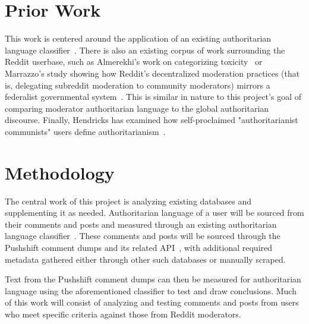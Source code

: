 \documentclass[letterpaper,twocolumn,10pt]{article}
\begin{document}
\section{Prior Work}

This work is centered around the application of an existing authoritarian language classifier~\cite{classifier}. There is also an existing corpus of work surrounding the Reddit userbase, such as Almerekhi's work on categorizing toxicity~\cite{reddit-toxicity} or Marrazzo's study showing how Reddit's decentralized moderation practices (that is, delegating subreddit moderation to community moderators) mirrors a federalist governmental system~\cite{federalist}. This is similar in nature to this project's goal of comparing moderator authoritarian language to the global authoritarian discourse. Finally, Hendricks has examined how self-proclaimed "authoritarianist communists" users define authoritarianism~\cite{communists}.

\section{Methodology}


The central work of this project is analyzing existing databases and supplementing it as needed. Authoritarian language of a user will be sourced from their comments and posts and measured through an existing authoritarian language classifier~\cite{classifier}. These comments and posts will be sourced through the Pushshift comment dumps and its related API~\cite{pushshift, dump}, with additional required metadata gathered either through other such databases or manually scraped.

Text from the Pushshift comment dumps can then be measured for authoritarian language using the aforementioned classifier to test and draw conclusions. Much of this work will consist of analyzing and testing comments and posts from users who meet specific criteria against those from Reddit moderators.
\end{document}
